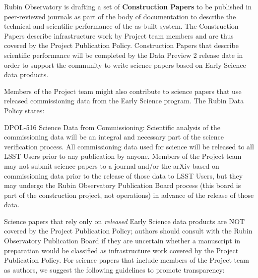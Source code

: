 \documentclass[SE,authoryear,toc,lsstdraft]{lsstdoc}
\begin{document}
Rubin Observatory is drafting a set of \textbf{Construction Papers} to be published in peer-reviewed journals as part of the body of documentation to describe the technical and scientific performance of the as-built system.
The Construction Papers describe infrastructure work by Project team members and are thus covered by the Project Publication Policy.
Construction Papers that describe scientific performance will be completed by the Data Preview 2 release date in order to support the community to write science papers based on Early Science data products.

Members of the Project team might also contribute to science papers that use released commissioning data from the Early Science program.
The Rubin Data Policy  states:

\begin{emph}
  {DPOL-516 Science Data from Commissioning: Scientific analysis of the commissioning data will be an integral and necessary part of the science verification process.
  All commissioning data used for science will be released to all LSST Users prior to any publication by anyone.
  Members of the Project team may not submit science papers to a journal and/or the arXiv based on commissioning data prior to the release of those data to LSST Users, but they may undergo the Rubin Observatory Publication Board process (this board is part of the construction project, not operations) in advance of the release of those data.}
\end{emph}



Science papers that rely only on \emph{released} Early Science data products are NOT covered by the Project Publication Policy; authors should consult with the Rubin Observatory Publication Board if they are uncertain whether a manuscript in preparation would be classified as infrastructure work covered by the Project Publication Policy.
For science papers that include members of the Project team as authors, we suggest the following guidelines to promote transparency:
\end{document}
